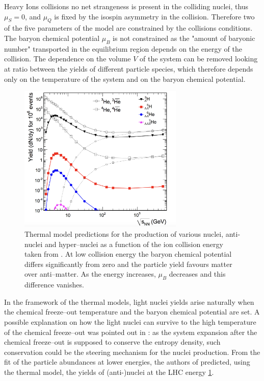 Heavy Ions collisions no net strangeness is present in the colliding nuclei, thus 
$\mu_S = 0$, and $\mu_Q$ is fixed by the isospin asymmetry in the collision.
Therefore two of the five parameters of the model are constrained by the collisions
conditions.
The baryon chemical potential $\mu_B$ is not constrained as the "amount of baryonic number"
transported in the equilibrium region depends on the energy of the collision.
The dependence on the volume $V$ of the system can be removed looking at ratio between 
the yields of different particle species, which therefore depends only on the temperature 
of the system and on the baryon chemical potential.
\begin{figure} 
    \centering
    \includegraphics[width=0.7\textwidth]{gfx/yields}
    \caption{Thermal model predictions for the production of various nuclei, anti-nuclei and hyper–nuclei as a function of the ion collision energy taken from \cite{yields}. At low collision energy the baryon chemical potential differs significantly from zero and the particle yield favours matter over anti–matter. As the energy increases, $\mu_{B}$ decreases and this difference vanishes.
}
\label{fig:aliceyields}
\end{figure}
In the framework of the thermal models, light nuclei yields arise naturally when the chemical 
freeze–out temperature and the baryon chemical potential are set.
A possible explanation on how the light nuclei can survive to the high temperature of the chemical 
freeze–out was pointed out in \cite{yields}: as the system expansion after the chemical freeze–out
is supposed to conserve the entropy density, such conservation could be the steering mechanism for 
the nuclei production. From the fit of the particle abundances at lower energies, the 
authors of \cite{yields} predicted, using the thermal model, the yields of (anti-)nuclei 
at the LHC energy \ref{fig:aliceyields}.

